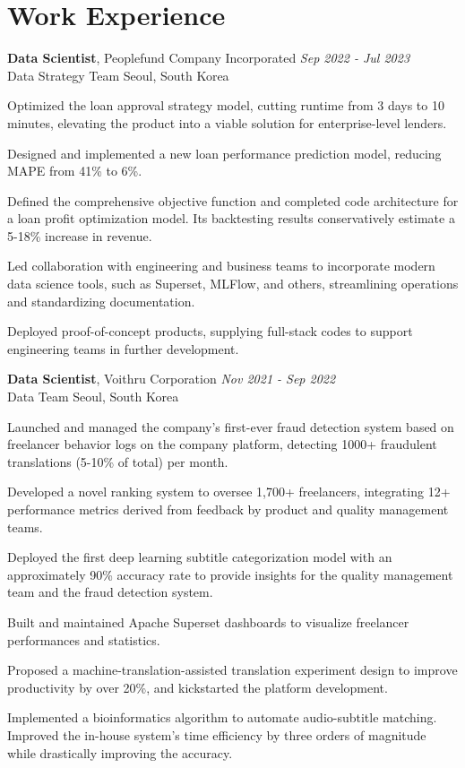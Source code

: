 \section{\mysidestyle Work Experience}
\textbf{Data Scientist}, Peoplefund Company Incorporated \hfill \textsl{Sep 2022 - Jul 2023}\\
Data Strategy Team \hfill Seoul, South Korea

\begin{list2}
    \item {Optimized the loan approval strategy model, cutting runtime from 3 days to 10 minutes, elevating the product into a viable solution for enterprise-level lenders.}
    \item {Designed and implemented a new loan performance prediction model, reducing MAPE from 41\% to 6\%.}
    \item {Defined the comprehensive objective function and completed code architecture for a loan profit optimization model. Its backtesting results conservatively estimate a 5-18\% increase in revenue.}
    \item {Led collaboration with engineering and business teams to incorporate modern data science tools, such as Superset, MLFlow, and others, streamlining operations and standardizing documentation.}
    \item {Deployed proof-of-concept products, supplying full-stack codes to support engineering teams in further development.}
\end{list2}

\textbf{Data Scientist}, Voithru Corporation \hfill \textsl{Nov 2021 - Sep 2022}\\
Data Team \hfill Seoul, South Korea

\begin{list2}
    \item {Launched and managed the company's first-ever fraud detection system based on freelancer behavior logs on the company platform, detecting 1000+ fraudulent translations (5-10\% of total) per month.}
    \item {Developed a novel ranking system to oversee 1,700+ freelancers, integrating 12+ performance metrics derived from feedback by product and quality management teams.}
    \item {Deployed the first deep learning subtitle categorization model with an approximately 90\% accuracy rate to provide insights for the quality management team and the fraud detection system.}
    \item {Built and maintained Apache Superset dashboards to visualize freelancer performances and statistics.}
    \item {Proposed a machine-translation-assisted translation experiment design to improve productivity by over 20\%, and kickstarted the platform development.}
    \item {Implemented a bioinformatics algorithm to automate audio-subtitle matching. Improved the in-house system's time efficiency by three orders of magnitude while drastically improving the accuracy.}
\end{list2}